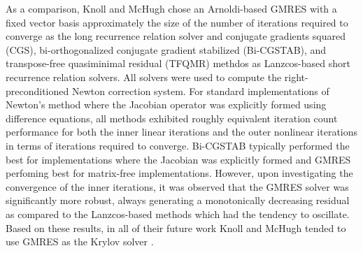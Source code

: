 As a comparison, Knoll and McHugh chose an Arnoldi-based GMRES with a
fixed vector basis approximately the size of the number of iterations
required to converge as the long recurrence relation solver and
conjugate gradients squared (CGS), bi-orthogonalized conjugate
gradient stabilized (Bi-CGSTAB), and transpose-free quasiminimal
residual (TFQMR) methdos as Lanzcos-based short recurrence relation
solvers. All solvers were used to compute the right-preconditioned
Newton correction system. For standard implementations of Newton's
method where the Jacobian operator was explicitly formed using
difference equations, all methods exhibited roughly equivalent
iteration count performance for both the inner linear iterations and
the outer nonlinear iterations in terms of iterations required to
converge. Bi-CGSTAB typically performed the best for
implementations where the Jacobian was explicitly formed and GMRES
perfoming best for matrix-free implementations. However, upon
investigating the convergence of the inner iterations, it was observed
that the GMRES solver was significantly more robust, always generating
a monotonically decreasing residual as compared to the Lanzcos-based
methods which had the tendency to oscillate. Based on these results,
in all of their future work Knoll and McHugh tended to use GMRES as
the Krylov solver \citep{knoll_jacobian-free_2004}.

